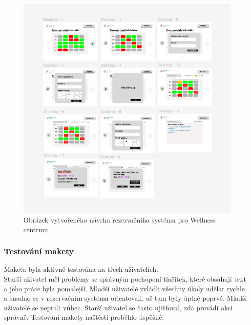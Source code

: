 \begin{figure}[htbp]
    \centering
    \includegraphics[width = \textwidth]{doc/latex/fig/vit/3.png}
    \caption{Obrázek vytvořeného návrhu rezervačního systému pro Wellness centrum}
    \label{fig:Vit_k2}
\end{figure}

\newpage
\subsubsection*{Testování makety}
Maketa byla aktivně testována na třech uživatelích.\\
Starší uživatel měl problémy se správným pochopení tlačítek, které obsahují text a jeho práce byla pomalejší. Mladší uživatelé zvládli všechny úkoly udělat rychle a snadno se v rezervačním systému orientovali, ač tam byly úplně poprvé. Mladší uživatelé se neptali vůbec. Starší uživatel se často ujišťoval, zda provádí akci správně. Testování makety naštěstí proběhlo úspěšně. 


\newpage

